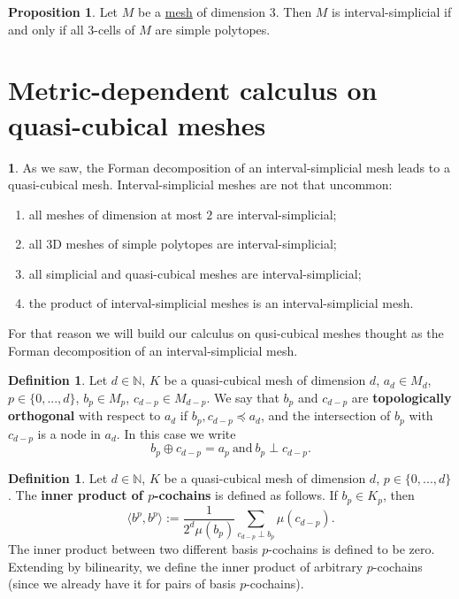 \documentclass[fleqn]{article}
\theoremstyle{definition}
\newtheorem{proposition}[theorem]{Proposition}
\newtheorem{definition}[theorem]{Definition}
\newtheorem{discussion}[theorem]{}
\newcommand{\N}{\mathbb{N}}
\newcommand{\inner}[2]{\langle#1,#2\rangle}
\begin{document}
\begin{proposition}
  Let $M$ be a \hyperref[idec:mesh:definition]{mesh} of dimension $3$.
  Then $M$ is interval-simplicial if and only if all $3$-cells of $M$
  are simple polytopes.
\end{proposition}

\section{Metric-dependent calculus on quasi-cubical meshes}

\begin{discussion}
  As we saw, the Forman decomposition of an interval-simplicial mesh leads to a
  quasi-cubical mesh.
  Interval-simplicial meshes are not that uncommon:
  \begin{enumerate}
    \item
      all meshes of dimension at most $2$ are interval-simplicial;
    \item
      all $3$D meshes of simple polytopes are interval-simplicial;
    \item
      all simplicial and quasi-cubical meshes are interval-simplicial;
    \item
      the product of interval-simplicial meshes is an interval-simplicial mesh.
  \end{enumerate}
  For that reason we will build our calculus on qusi-cubical meshes thought as
  the Forman decomposition of an interval-simplicial mesh.
\end{discussion}

\begin{definition}
  Let
    $d \in \N$,
    $K$ be a quasi-cubical mesh of dimension $d$,
    $a_d \in M_d$,
    $p \in \{0, ..., d\}$,
    $b_p \in M_p$,
    $c_{d - p} \in M_{d - p}$.
  We say that $b_p$ and $c_{d - p}$ are \textbf{topologically orthogonal}
  with respect to $a_d$ if $b_p, c_{d - p} \preceq a_d$, and the intersection of
  $b_p$ with $c_{d - p}$ is a node in $a_d$.
  In this case we write
  \begin{equation}
    b_p \oplus c_{d - p} = a_p\
    \text{and}\
    b_p \perp c_{d - p}.
  \end{equation}
\end{definition}

\begin{definition}
  Let
    $d \in \N$,
    $K$ be a quasi-cubical mesh of dimension $d$,
    $p \in \{0, ..., d\}$.
  The \textbf{inner product of $p$-cochains} is defined as follows.
  If $b_p \in K_p$, then
  \begin{equation}
    \inner{b^p}{b^p} :=
    \frac{1}{2^d \mu(b_p)} \sum_{c_{d - p} \perp b_p} \mu(c_{d - p}).
  \end{equation}
  The inner product between two different basis $p$-cochains
  is defined to be zero.
  Extending by bilinearity, we define the inner product of arbitrary
  $p$-cochains (since we already have it for pairs of basis $p$-cochains).
\end{definition}
\end{document}
